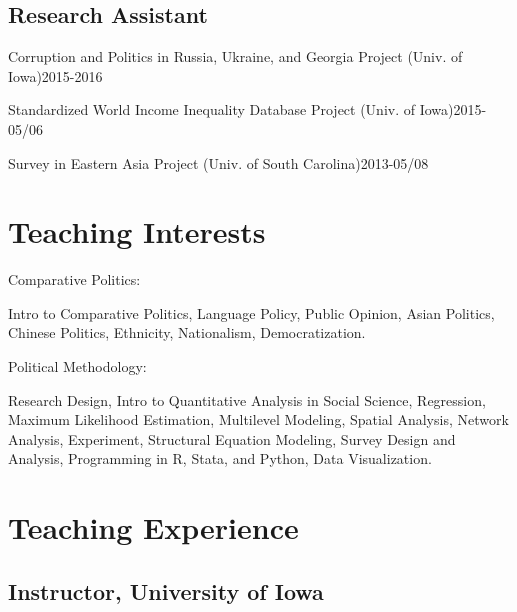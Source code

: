 \documentclass[10.5pt,]{article}
\providecommand{\tightlist}{%
	\setlength{\itemsep}{0pt}\setlength{\parskip}{0pt}}
\renewenvironment{itemize}{
	\begin{list}{}{
			\setlength{\leftmargin}{1.5em}
		}
	}{
	\end{list}
}
\begin{document}
\subsection{Research Assistant}\label{research-assistant}

\begin{itemize}
\tightlist
\item
  Corruption and Politics in Russia, Ukraine, and Georgia Project (Univ.
  of Iowa)\hfill 2015-2016
\item
  Standardized World Income Inequality Database Project (Univ. of
  Iowa)\hfill 2015-05/06
\item
  Survey in Eastern Asia Project (Univ. of South
  Carolina)\hfill 2013-05/08
\end{itemize}

\section{Teaching Interests}\label{teaching-interests}

\begin{itemize}
\tightlist
\item
  Comparative Politics:

  \begin{itemize}
  \tightlist
  \item
    Intro to Comparative Politics, Language Policy, Public Opinion,
    Asian Politics, Chinese Politics, Ethnicity, Nationalism,
    Democratization.
  \end{itemize}
\item
  Political Methodology:

  \begin{itemize}
  \tightlist
  \item
    Research Design, Intro to Quantitative Analysis in Social Science,
    Regression, Maximum Likelihood Estimation, Multilevel Modeling,
    Spatial Analysis, Network Analysis, Experiment, Structural Equation
    Modeling, Survey Design and Analysis, Programming in R, Stata, and
    Python, Data Visualization.
  \end{itemize}
\end{itemize}

\section{Teaching Experience}\label{teaching-experience}

\subsection{Instructor, University of
Iowa}\label{instructor-university-of-iowa}
\end{document}
